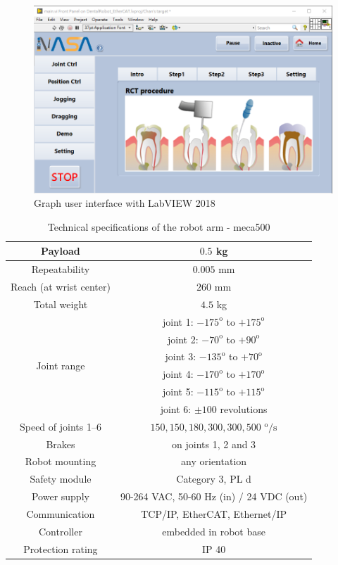 \begin{figure}[htbp]
\begin{center}
\includegraphics[width=1\linewidth]{Images/GUI.png}
\caption{Graph user interface with LabVIEW 2018}
\label{fig:GUI}
\end{center}
\end{figure}
\begin{table}[htbp]
\centering
\caption{Technical specifications of the robot arm - meca500}
\label{tab:meca_specification}
\par
\begin{tabular}{|c|c|} 
\hline
Payload						&$0.5$ kg					\\	\hline
Repeatability				&$0.005$ mm					\\	\hline
Reach (at wrist center)		&$260$ mm	\\ \hline
Total weight				&$4.5$ kg						\\	\hline
\multirow{6}{*}{Joint range}&joint 1: $-175^\text{o}$ to $+175^\text{o}$				\\	
							&joint 2: $-70^\text{o}$ to $+90^\text{o}$				\\	
							&joint 3: $-135^\text{o}$ to $+70^\text{o}$				\\	
							&joint 4: $-170^\text{o}$ to $+170^\text{o}$				\\	
							&joint 5: $-115^\text{o}$ to $+115^\text{o}$				\\	
							&joint 6: $\pm 100$ revolutions				\\	\hline
Speed of joints 1–6 &${150, 150, 180, 300, 300, 500}$ $^\text{o}\text{/s}$				\\	\hline
Brakes 				&on joints 1, 2 and 3				\\	\hline
Robot mounting 		&any orientation				\\	\hline
Safety module		&Category 3, PL d				\\	\hline
Power supply 		&90-264 VAC, 50-60 Hz (in) / 24 VDC (out)				\\	\hline
Communication 		&TCP/IP, EtherCAT, Ethernet/IP				\\	\hline
Controller 			&embedded in robot base				\\	\hline
Protection rating 	&IP 40								\\	
\hline
\end{tabular}
\end{table}


